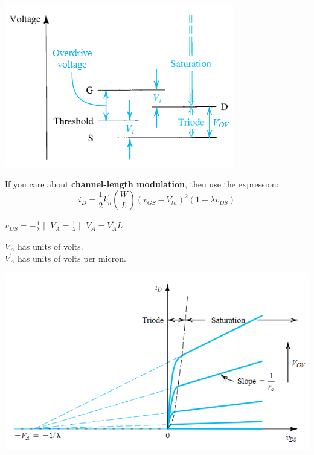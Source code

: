 \documentclass[a4paper]{article}
\begin{document}
\begin{multicols}{3}
\includegraphics[width=\linewidth]{imgs/mosfet_operation.png}

If you care about \textbf{channel-length modulation}, then use
the expression:
$$i_D=\frac{1}{2}k_n^{'}\left(\frac{W}{L}\right)(v_{GS}-V_{th})^2(1+\lambda v_{DS})$$

$v_{DS}=-\frac{1}{\lambda} \mid$
$V_A=\frac{1}{\lambda} \mid$
$V_A=V_A^{'}L$  

$V_A$ has units of volts.\\
$V_A^{'}$ has units of volts per micron.

\includegraphics[width=\linewidth]{imgs/va_mosfet.png}



\end{multicols}
\end{document}
